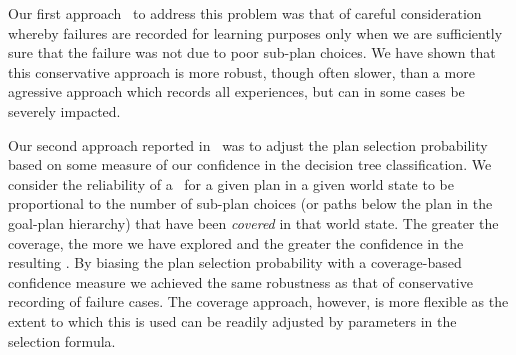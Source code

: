 
Our first approach~\cite{Airiau:IJAT:09} to address this problem was that 
of careful consideration whereby failures are recorded for learning purposes 
only when we are sufficiently sure that the failure was not due to poor
sub-plan choices. 
We have shown that this conservative approach is more robust, 
though often slower, than a more agressive
approach which records all experiences, but can in some cases be
severely impacted.

Our second approach reported in~\cite{Singh:AAMAS10} was to
adjust the plan selection probability based on some measure of 
our confidence in the decision tree classification.
%
We consider the reliability of a \dt\ for a given plan in a given 
world state to be proportional to the number of sub-plan choices (or paths
below the plan in the goal-plan hierarchy) that have been \textit{covered} in that 
world state. The greater the coverage, the more we have explored and the
greater the confidence in the resulting \dt.
%
By biasing the plan selection probability with a coverage-based confidence
measure we achieved the same robustness as that of conservative recording of 
failure cases. The coverage approach, however, is more 
flexible as the extent to which this is used can be
readily adjusted by parameters in the selection formula. 



